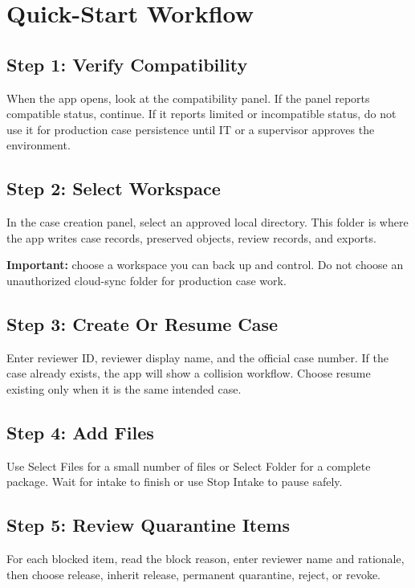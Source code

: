 \chapter{Quick-Start Workflow}

\section{Step 1: Verify Compatibility}

When the app opens, look at the compatibility panel. If the panel reports compatible status, continue. If it reports limited or incompatible status, do not use it for production case persistence until IT or a supervisor approves the environment.

\section{Step 2: Select Workspace}

In the case creation panel, select an approved local directory. This folder is where the app writes case records, preserved objects, review records, and exports.

\textbf{Important:} choose a workspace you can back up and control. Do not choose an unauthorized cloud-sync folder for production case work.

\section{Step 3: Create Or Resume Case}

Enter reviewer ID, reviewer display name, and the official case number. If the case already exists, the app will show a collision workflow. Choose resume existing only when it is the same intended case.

\section{Step 4: Add Files}

Use Select Files for a small number of files or Select Folder for a complete package. Wait for intake to finish or use Stop Intake to pause safely.

\section{Step 5: Review Quarantine Items}

For each blocked item, read the block reason, enter reviewer name and rationale, then choose release, inherit release, permanent quarantine, reject, or revoke.

